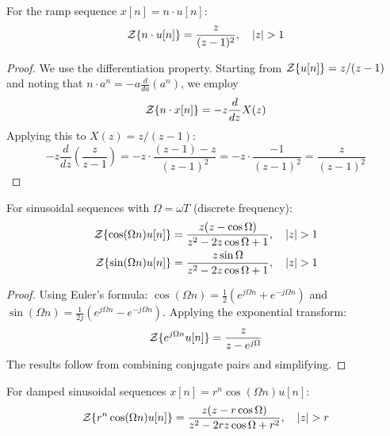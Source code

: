 \begin{theorem}
For the ramp sequence $x[n] = n \cdot u[n]$:
\begin{equation}
\mathcal{Z}\{n \cdot u[n]\} = \frac{z}{(z-1)^2}, \quad |z| > 1
\end{equation}
\end{theorem}

\begin{proof}
We use the differentiation property. Starting from $\mathcal{Z}\{u[n]\} = z/(z-1)$ and noting that $n \cdot a^n = -a \frac{d}{da}(a^n)$, we employ
\begin{equation}
\mathcal{Z}\{n \cdot x[n]\} = -z \frac{d}{dz} X(z)
\end{equation}
Applying this to $X(z) = z/(z-1)$:
\begin{equation}
-z \frac{d}{dz}\left(\frac{z}{z-1}\right) = -z \cdot \frac{(z-1) - z}{(z-1)^2} = -z \cdot \frac{-1}{(z-1)^2} = \frac{z}{(z-1)^2}
\end{equation}
\end{proof}

\begin{theorem}
For sinusoidal sequences with $\Omega = \omega T$ (discrete frequency):
\begin{align}
\mathcal{Z}\{\cos(\Omega n) u[n]\} &= \frac{z(z - \cos\Omega)}{z^2 - 2z\cos\Omega + 1}, \quad |z| > 1 \\
\mathcal{Z}\{\sin(\Omega n) u[n]\} &= \frac{z \sin\Omega}{z^2 - 2z\cos\Omega + 1}, \quad |z| > 1
\end{align}
\end{theorem}

\begin{proof}
Using Euler's formula: $\cos(\Omega n) = \frac{1}{2}(e^{j\Omega n} + e^{-j\Omega n})$ and $\sin(\Omega n) = \frac{1}{2j}(e^{j\Omega n} - e^{-j\Omega n})$. Applying the exponential transform:
\begin{equation}
\mathcal{Z}\{e^{j\Omega n} u[n]\} = \frac{z}{z - e^{j\Omega}}
\end{equation}
The results follow from combining conjugate pairs and simplifying.
\end{proof}

\begin{theorem}
For damped sinusoidal sequences $x[n] = r^n \cos(\Omega n) u[n]$:
\begin{equation}
\mathcal{Z}\{r^n \cos(\Omega n) u[n]\} = \frac{z(z - r\cos\Omega)}{z^2 - 2rz\cos\Omega + r^2}, \quad |z| > r
\end{equation}
\end{theorem}

